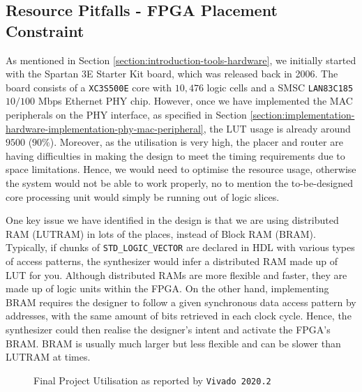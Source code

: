 \documentclass[a4paper]{report}
\newcommand{\code}{\texttt}
\begin{document}
\subsection{Resource Pitfalls - FPGA Placement Constraint}

As mentioned in Section \ref{section:introduction-tools-hardware}, we initially started with the Spartan 3E Starter Kit board, which was released back in 2006. The board consists of a \code{XC3S500E} core with $10,476$ logic cells \cite{xilinx-documentation-2011-core} and a SMSC \code{LAN83C185} $10/100$ Mbps Ethernet PHY chip. However, once we have implemented the MAC peripherals on the PHY interface, as specified in Section \ref{section:implementation-hardware-implementation-phy-mac-peripheral}, the LUT usage is already around $9500$ ($90\%$). Moreover, as the utilisation is very high, the placer and router are having difficulties in making the design to meet the timing requirements due to space limitations. Hence, we would need to optimise the resource usage, otherwise the system would not be able to work properly, no to mention the to-be-designed core processing unit would simply be running out of logic slices. 

One key issue we have identified in the design is that we are using distributed RAM (LUTRAM) in lots of the places, instead of Block RAM (BRAM). Typically, if chunks of \code{STD\_LOGIC\_VECTOR} are declared in HDL with various types of access patterns, the synthesizer would infer a distributed RAM made up of LUT for you. Although distributed RAMs are more flexible and faster, they are made up of logic units within the FPGA. On the other hand, implementing BRAM requires the designer to follow a given synchronous data access pattern by addresses, with the same amount of bits retrieved in each clock cycle. Hence, the synthesizer could then realise the designer's intent and activate the FPGA's BRAM. BRAM is usually much larger but less flexible and can be slower than LUTRAM at times. 

\begin{figure}[h!]
  \caption{Final Project Utilisation as reported by \code{Vivado 2020.2}}
  \label{fig:utilisation-fpga}
\end{figure}
\end{document}
